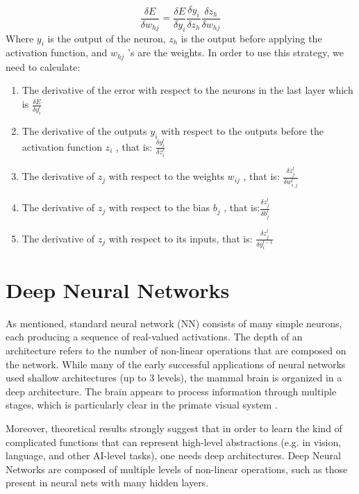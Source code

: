 \begin{equation}
\frac{\delta E}{\delta w_{hj}} = \frac{\delta E}{\delta y_i} \frac{\delta y_i}{\delta z_h} \frac{\delta z_h}{\delta w_{hj}}
\label{eq:CE}
\end{equation}
\indent Where $y_i$ is the output of the neuron, $z_h$ is the output before applying the activation
function, and $w_{hj}$ ’s are the weights. In order to use this strategy, we need to calculate:
\begin{enumerate}
\item The derivative of the error with respect to the neurons in the last layer which is $\frac{\delta E}{\delta y_i^{l}}$

\item The derivative of the outputs $ y_i$ with respect to the outputs before the activation function $z_i$ , that is: $\frac{\delta y_i^{l}}{\delta z_i^{l}} $

\item The derivative of $z_j$ with respect to the weights $w_{ij} $ , that is: $\frac{\delta z_j^{l}}{\delta w_{i,j}^{l}} $

\item The derivative of $z_j$ with respect to the bias $b_j$ , that is:$\frac{\delta z_j^{l}}{\delta b_j^{l}} $

\item The derivative of $z_j$ with respect to its inputs, that is: $ \frac{\delta z_j^{l}}{\delta y_i^{l-1}}$
\end{enumerate}









\section{Deep Neural Networks}
\label{sec:deepcnn}
As mentioned, standard neural network (NN) consists of many simple neurons, each producing a sequence of real-valued activations\cite{deepnn}. The depth of an architecture refers to the number of non-linear operations that are composed on the network. While many of the early successful applications of neural networks used shallow architectures (up to 3 levels), the mammal brain is organized in a deep architecture. The brain appears to process information through multiple stages, which is particularly clear in the primate visual system \cite{bengio2009learning}.

Moreover, theoretical results strongly suggest that in order to learn the kind of complicated functions that can represent high-level abstractions (e.g. in vision, language, and other AI-level tasks), one needs deep architectures. Deep Neural Networks are composed of multiple levels of non-linear operations, such as those present in neural nets with many hidden layers\cite{bengio2009learning}. 

